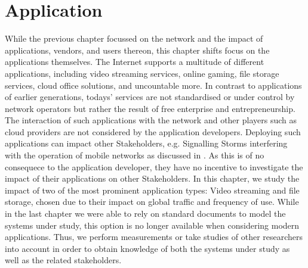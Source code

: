 \chapter{Application}\label{chap:application}

\newcommand{\download}{Download\xspace}
\newcommand{\live}{Live\xspace}
\newcommand{\serviceprovisioning}{Provisioning\xspace}
\newcommand{\streaming}{Streaming\xspace}

While the previous chapter focussed on the network and the impact of applications, vendors, and users thereon, this chapter shifts focus on the applications themselves.
The Internet supports a multitude of different applications, including video streaming services, online gaming, file storage services, cloud office solutions, and uncountable more.
In contrast to applications of earlier generations, todays' services are not standardised or under control by network operators but rather the result of free enterprise and entrepreneurship.
The interaction of such applications with the network and other players such as cloud providers are not considered by the application developers.
Deploying such applications can impact other Stakeholders, e.g. Signalling Storms interfering with the operation of mobile networks as discussed in .
As this is of no consequece to the application developer, they have no incentive to investigate the impact of their applications on other Stakeholders.
In this chapter, we study the impact of two of the most prominent application types: Video streaming and file storage, chosen due to their impact on global traffic and frequency of use.
While in the last chapter we were able to rely on standard documents to model the systems under study, this option is no longer available when considering modern applications.
Thus, we perform measurements or take studies of other researchers into account in order to obtain knowledge of both the systems under study as well as the related stakeholders.

